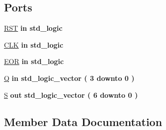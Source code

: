 \subsection*{Ports}
 \begin{DoxyCompactItemize}
\item 
\hyperlink{classhex__7seg_a98682ef7de2714e5bab788a2e2ff1b7f}{R\+S\+T}  {\bfseries {\bfseries \textcolor{keywordflow}{in}\textcolor{vhdlchar}{ }}} {\bfseries \textcolor{comment}{std\+\_\+logic}\textcolor{vhdlchar}{ }} 
\item 
\hyperlink{classhex__7seg_ab5d0ea9e968d49d94da9db07a979d402}{C\+L\+K}  {\bfseries {\bfseries \textcolor{keywordflow}{in}\textcolor{vhdlchar}{ }}} {\bfseries \textcolor{comment}{std\+\_\+logic}\textcolor{vhdlchar}{ }} 
\item 
\hyperlink{classhex__7seg_a6f660c38e0ae1047bcd9cb0ee0f6a6c4}{E\+O\+R}  {\bfseries {\bfseries \textcolor{keywordflow}{in}\textcolor{vhdlchar}{ }}} {\bfseries \textcolor{comment}{std\+\_\+logic}\textcolor{vhdlchar}{ }} 
\item 
\hyperlink{classhex__7seg_a339491269b71d7ffbcc64dfc623eedb6}{Q}  {\bfseries {\bfseries \textcolor{keywordflow}{in}\textcolor{vhdlchar}{ }}} {\bfseries \textcolor{comment}{std\+\_\+logic\+\_\+vector}\textcolor{vhdlchar}{ }\textcolor{vhdlchar}{(}\textcolor{vhdlchar}{ }\textcolor{vhdlchar}{ } \textcolor{vhdldigit}{3} \textcolor{vhdlchar}{ }\textcolor{keywordflow}{downto}\textcolor{vhdlchar}{ }\textcolor{vhdlchar}{ } \textcolor{vhdldigit}{0} \textcolor{vhdlchar}{ }\textcolor{vhdlchar}{)}\textcolor{vhdlchar}{ }} 
\item 
\hyperlink{classhex__7seg_a5bb18a11f9b29c18aee30a1b45131980}{S}  {\bfseries {\bfseries \textcolor{keywordflow}{out}\textcolor{vhdlchar}{ }}} {\bfseries \textcolor{comment}{std\+\_\+logic\+\_\+vector}\textcolor{vhdlchar}{ }\textcolor{vhdlchar}{(}\textcolor{vhdlchar}{ }\textcolor{vhdlchar}{ } \textcolor{vhdldigit}{6} \textcolor{vhdlchar}{ }\textcolor{keywordflow}{downto}\textcolor{vhdlchar}{ }\textcolor{vhdlchar}{ } \textcolor{vhdldigit}{0} \textcolor{vhdlchar}{ }\textcolor{vhdlchar}{)}\textcolor{vhdlchar}{ }} 
\end{DoxyCompactItemize}


\subsection{Member Data Documentation}
\hypertarget{classhex__7seg_ab5d0ea9e968d49d94da9db07a979d402}{}
